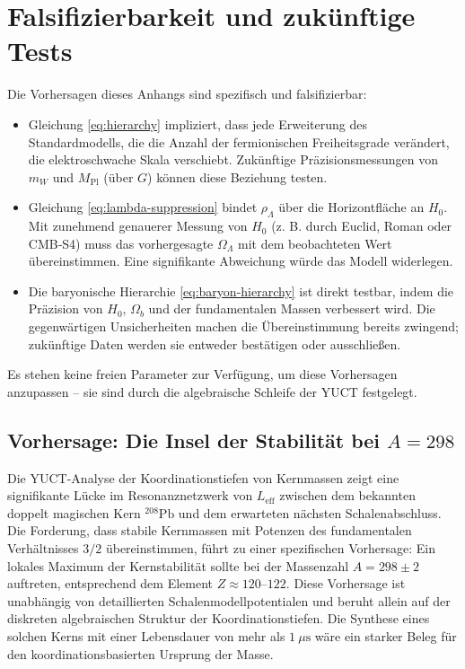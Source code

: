 \documentclass[11pt,a4paper]{article}
\theoremstyle{remark}
\begin{document}
	
	\section{Falsifizierbarkeit und zukünftige Tests}
	
	Die Vorhersagen dieses Anhangs sind spezifisch und falsifizierbar:
	\begin{itemize}
		\item Gleichung \eqref{eq:hierarchy} impliziert, dass jede Erweiterung des Standardmodells, die die Anzahl der fermionischen Freiheitsgrade verändert, die elektroschwache Skala verschiebt. Zukünftige Präzisionsmessungen von \(m_W\) und \(M_{\mathrm{Pl}}\) (über \(G\)) können diese Beziehung testen.
		\item Gleichung \eqref{eq:lambda-suppression} bindet \(\rho_\Lambda\) über die Horizontfläche an \(H_0\). Mit zunehmend genauerer Messung von \(H_0\) (z. B. durch Euclid, Roman oder CMB‑S4) muss das vorhergesagte \(\Omega_\Lambda\) mit dem beobachteten Wert übereinstimmen. Eine signifikante Abweichung würde das Modell widerlegen.
		\item Die baryonische Hierarchie \eqref{eq:baryon-hierarchy} ist direkt testbar, indem die Präzision von \(H_0\), \(\Omega_b\) und der fundamentalen Massen verbessert wird. Die gegenwärtigen Unsicherheiten machen die Übereinstimmung bereits zwingend; zukünftige Daten werden sie entweder bestätigen oder ausschließen.
	\end{itemize}
	Es stehen keine freien Parameter zur Verfügung, um diese Vorhersagen anzupassen – sie sind durch die algebraische Schleife der YUCT festgelegt.
	
	\subsection{Vorhersage: Die Insel der Stabilität bei \(A=298\)}
	
	Die YUCT-Analyse der Koordinationstiefen von Kernmassen zeigt eine signifikante Lücke im Resonanznetzwerk von \(L_{\mathrm{eff}}\) zwischen dem bekannten doppelt magischen Kern \(^{208}\mathrm{Pb}\) und dem erwarteten nächsten Schalenabschluss. Die Forderung, dass stabile Kernmassen mit Potenzen des fundamentalen Verhältnisses \(3/2\) übereinstimmen, führt zu einer spezifischen Vorhersage: Ein lokales Maximum der Kernstabilität sollte bei der Massenzahl \(A = 298 \pm 2\) auftreten, entsprechend dem Element \(Z \approx 120\)--\(122\). Diese Vorhersage ist unabhängig von detaillierten Schalenmodellpotentialen und beruht allein auf der diskreten algebraischen Struktur der Koordinationstiefen. Die Synthese eines solchen Kerns mit einer Lebensdauer von mehr als \(1\ \mu\text{s}\) wäre ein starker Beleg für den koordinationsbasierten Ursprung der Masse.
	
\end{document}

